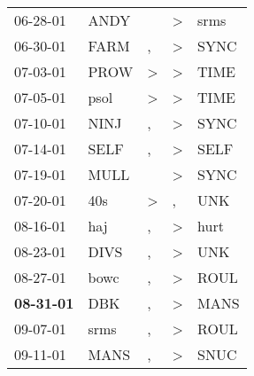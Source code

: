 \begin{supertabular}{p{0.07\textwidth}p{0.06\textwidth}p{0.02\textwidth}p{0.02\textwidth}p{0.06\textwidth}}
          06-28-01\textsuperscript{} &           ANDY\textsuperscript{} &                  &     \textgreater &           srms\textsuperscript{} \\
          06-30-01\textsuperscript{} &           FARM\textsuperscript{} &                , &     \textgreater &           SYNC\textsuperscript{} \\
          07-03-01\textsuperscript{} &           PROW\textsuperscript{} &     \textgreater &     \textgreater &           TIME\textsuperscript{} \\
          07-05-01\textsuperscript{} &           psol\textsuperscript{} &     \textgreater &     \textgreater &           TIME\textsuperscript{} \\
          07-10-01\textsuperscript{} &           NINJ\textsuperscript{} &                , &     \textgreater &           SYNC\textsuperscript{} \\
          07-14-01\textsuperscript{} &           SELF\textsuperscript{} &                , &     \textgreater &           SELF\textsuperscript{} \\
          07-19-01\textsuperscript{} &           MULL\textsuperscript{} &                  &     \textgreater &           SYNC\textsuperscript{} \\
          07-20-01\textsuperscript{} &            40s\textsuperscript{} &     \textgreater &                , &            UNK\textsuperscript{} \\
          08-16-01\textsuperscript{} &            haj\textsuperscript{} &                , &     \textgreater &           hurt\textsuperscript{} \\
          08-23-01\textsuperscript{} &           DIVS\textsuperscript{} &                , &     \textgreater &            UNK\textsuperscript{} \\
          08-27-01\textsuperscript{} &           bowc\textsuperscript{} &                , &     \textgreater &           ROUL\textsuperscript{} \\
 \textbf{08-31-01\textsuperscript{}} &            DBK\textsuperscript{} &                , &     \textgreater &           MANS\textsuperscript{} \\
          09-07-01\textsuperscript{} &           srms\textsuperscript{} &                , &     \textgreater &           ROUL\textsuperscript{} \\
          09-11-01\textsuperscript{} &           MANS\textsuperscript{} &                , &     \textgreater &           SNUC\textsuperscript{} \\

\end{supertabular}
